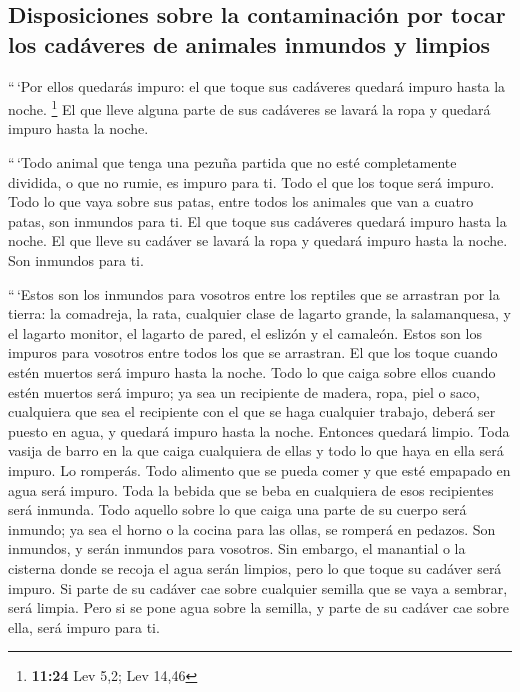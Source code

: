 \hypertarget{disposiciones-sobre-la-contaminaciuxf3n-por-tocar-los-caduxe1veres-de-animales-inmundos-y-limpios}{%
\subsection{Disposiciones sobre la contaminación por tocar los cadáveres
de animales inmundos y
limpios}\label{disposiciones-sobre-la-contaminaciuxf3n-por-tocar-los-caduxe1veres-de-animales-inmundos-y-limpios}}

 ``\,`Por ellos quedarás impuro: el que toque sus
cadáveres quedará impuro hasta la noche. \footnote{\textbf{11:24} Lev
  5,2; Lev 14,46}  El que lleve alguna parte de sus
cadáveres se lavará la ropa y quedará impuro hasta la noche.

 ``\,`Todo animal que tenga una pezuña partida que no
esté completamente dividida, o que no rumie, es impuro para ti. Todo el
que los toque será impuro.  Todo lo que vaya sobre sus
patas, entre todos los animales que van a cuatro patas, son inmundos
para ti. El que toque sus cadáveres quedará impuro hasta la noche.
 El que lleve su cadáver se lavará la ropa y quedará
impuro hasta la noche. Son inmundos para ti.

 ``\,`Estos son los inmundos para vosotros entre los
reptiles que se arrastran por la tierra: la comadreja, la rata,
cualquier clase de lagarto grande,  la salamanquesa, y el
lagarto monitor, el lagarto de pared, el eslizón y el camaleón.
 Estos son los impuros para vosotros entre todos los que
se arrastran. El que los toque cuando estén muertos será impuro hasta la
noche.  Todo lo que caiga sobre ellos cuando estén
muertos será impuro; ya sea un recipiente de madera, ropa, piel o saco,
cualquiera que sea el recipiente con el que se haga cualquier trabajo,
deberá ser puesto en agua, y quedará impuro hasta la noche. Entonces
quedará limpio.  Toda vasija de barro en la que caiga
cualquiera de ellas y todo lo que haya en ella será impuro. Lo romperás.
 Todo alimento que se pueda comer y que esté empapado en
agua será impuro. Toda la bebida que se beba en cualquiera de esos
recipientes será inmunda.  Todo aquello sobre lo que
caiga una parte de su cuerpo será inmundo; ya sea el horno o la cocina
para las ollas, se romperá en pedazos. Son inmundos, y serán inmundos
para vosotros.  Sin embargo, el manantial o la cisterna
donde se recoja el agua serán limpios, pero lo que toque su cadáver será
impuro.  Si parte de su cadáver cae sobre cualquier
semilla que se vaya a sembrar, será limpia.  Pero si se
pone agua sobre la semilla, y parte de su cadáver cae sobre ella, será
impuro para ti.

